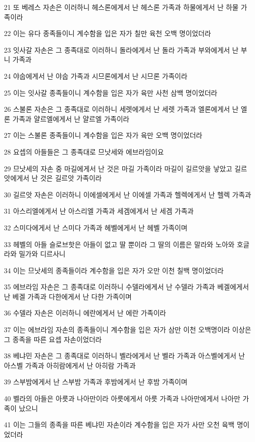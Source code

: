 \par 21 또 베레스 자손은 이러하니 헤스론에게서 난 헤스론 가족과 하물에게서 난 하물 가족이라
\par 22 이는 유다 종족들이니 계수함을 입은 자가 칠만 육천 오백 명이었더라
\par 23 잇사갈 자손은 그 종족대로 이러하니 돌라에게서 난 돌라 가족과 부와에게서 난 부니 가족과
\par 24 야숩에게서 난 야숩 가족과 시므론에게서 난 시므론 가족이라
\par 25 이는 잇사갈 종족들이니 계수함을 입은 자가 육만 사천 삼백 명이었더라
\par 26 스불론 자손은 그 종족대로 이러하니 세렛에게서 난 세렛 가족과 엘론에게서 난 엘론 가족과 얄르엘에게서 난 얄르엘 가족이라
\par 27 이는 스불론 종족들이니 계수함을 입은 자가 육만 오백 명이었더라
\par 28 요셉의 아들들은 그 종족대로 므낫세와 에브라임이요
\par 29 므낫세의 자손 중 마길에게서 난 것은 마길 가족이라 마길이 길르앗을 낳았고 길르앗에게서 난 것은 길르앗 가족이라
\par 30 길르앗 자손은 이러하니 이에셀에게서 난 이에셀 가족과 헬렉에게서 난 헬렉 가족과
\par 31 아스리엘에게서 난 아스리엘 가족과 세겜에게서 난 세겜 가족과
\par 32 스미다에게서 난 스미다 가족과 헤벨에게서 난 헤벨 가족이며
\par 33 헤벨의 아들 슬로브핫은 아들이 없고 딸 뿐이라 그 딸의 이름은 말라와 노아와 호글라와 밀가와 디르사니
\par 34 이는 므낫세의 종족들이라 계수함을 입은 자가 오만 이천 칠백 명이었더라
\par 35 에브라임 자손은 그 종족대로 이러하니 수델라에게서 난 수델라 가족과 베겔에게서 난 베겔 가족과 다한에게서 난 다한 가족이며
\par 36 수델라 자손은 이러하니 에란에게서 난 에란 가족이라
\par 37 이는 에브라임 자손의 종족들이니 계수함을 입은 자가 삼만 이천 오백명이라 이상은 그 종족을 따른 요셉 자손이었더라
\par 38 베냐민 자손은 그 종족대로 이러하니 벨라에게서 난 벨라 가족과 아스벨에게서 난 아스벨 가족과 아히람에게서 난 아히람 가족과
\par 39 스부밤에게서 난 스부밤 가족과 후밤에게서 난 후밤 가족이며
\par 40 벨라의 아들은 아릇과 나아만이라 아릇에게서 아릇 가족과 나아만에게서 나아만 가족이 났으니
\par 41 이는 그들의 종족을 따른 베냐민 자손이라 계수함을 입은 자가 사만 오천 육백 명이었더라

